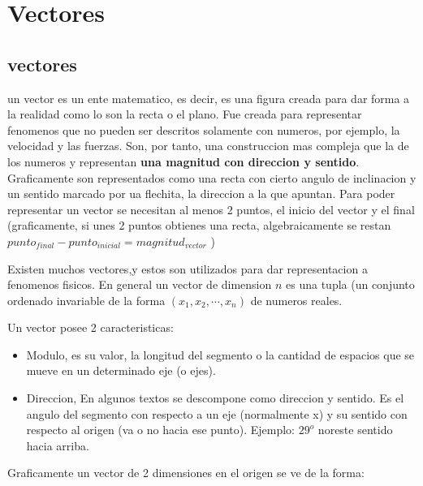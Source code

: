 
\section{Vectores}

\subsection{vectores}

 un vector es un ente matematico, es decir, es una figura creada para dar
    forma a la realidad como lo son la recta o el plano. Fue creada para
    representar fenomenos que no pueden ser descritos solamente con numeros, por
    ejemplo, la velocidad y las fuerzas. Son, por tanto, una construccion
    mas compleja que  la de los numeros y representan \textbf{una magnitud con
    direccion y sentido}. Graficamente son representados como una recta con
    cierto angulo de inclinacion y un sentido marcado por ua flechita, la
    direccion a la que apuntan.  Para poder representar un vector se necesitan
    al menos 2 puntos, el inicio del vector y el final (graficamente, si unes 2
    puntos obtienes una recta, algebraicamente se restan $punto_{final}-
    punto_{inicial}=magnitud_{vector}$ )

    Existen muchos vectores,y estos son utilizados para dar representacion a
    fenomenos fisicos. En general un vector de dimension $n$ es una tupla (un
    conjunto ordenado invariable de la forma $(x_1,x_2,\cdots,x_n)$ de numeros
    reales.

    Un vector posee 2 caracteristicas:

    \begin{itemize} \item Modulo, es su valor, la longitud del segmento o la
                cantidad de espacios que se mueve en un determinado eje (o
                ejes).

        \item Direccion, En algunos textos se descompone como direccion y
            sentido.  Es el angulo del segmento con respecto a un eje
            (normalmente x) y su sentido con respecto al origen (va o no hacia
            ese punto). Ejemplo: $29^o$ noreste sentido hacia arriba.
    \end{itemize}

    Graficamente un vector de 2 dimensiones en el origen se ve de la forma:


